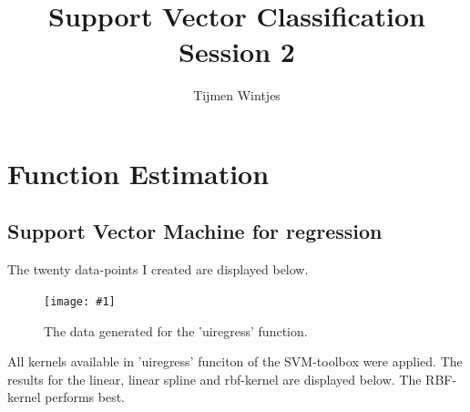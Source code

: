 \documentclass[•]{article}
\author{Tijmen Wintjes}
\title{Support Vector Classification \\ Session 2}
\newcommand{\apicture}[2] {
  \begin{figure}[H]
  \centering
  \texttt{[image: \#1]}
  \caption{#2}
  \end{figure}
}
\begin{document}
\maketitle
\section{Function Estimation}
\subsection{Support Vector Machine for regression}
The twenty data-points I created are displayed below.

\apicture{datagen.png}{The data generated for the 'uiregress' function.}

All kernels available in 'uiregress' funciton of the SVM-toolbox were applied. The results for the linear, linear spline and rbf-kernel are displayed below. The RBF-kernel performs best.
\end{document}
